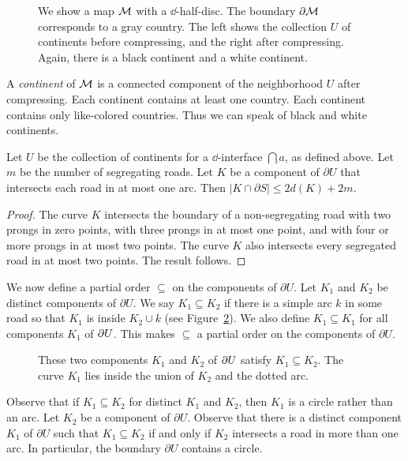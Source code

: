 \begin{figure}
% 
\hspace{.5in}
\caption{
We show a map $\mathcal{M}$ with a $\dd$-half-disc.  The boundary $\partial\mathcal{M}$ corresponds to a gray country.  The left shows the collection $U$ of continents before compressing, and the right after compressing.  Again, there is a black continent and a white continent.}
\label{graymap}
\end{figure}

A \emph{continent} of $\mathcal{M}$ is a connected component of the
neighborhood $U$ after compressing.  Each continent 
contains at least one country.
Each continent contains only like-colored countries.
Thus we can speak of black and white continents.

\begin{lemma}
\label{main lemma fact}
Let $U$ be the collection of continents for a $\dd$-interface
$\dint{a}$, as defined above.  Let $m$ be the number of 
segregating roads.  
Let $K$ be a component of $\partial U$ that intersects each road 
in at most one arc.  Then $|K\cap \partial S|\leq 2d(K)+2m$.
\end{lemma}

\begin{proof}
The curve $K$ intersects the boundary of a non-segregating road with 
two prongs in zero points, with three prongs in at most one point, 
and with four or more prongs in at most two points.
The curve $K$ also intersects every segregated road in at most 
two points.  The result follows.
\end{proof}

We now define a partial order $\subseteq$ on the components of 
$\partial U$.  Let $K_1$ and $K_2$ be distinct components of 
$\partial U$.  We say $K_1\subseteq K_2$ if there is a
simple arc $k$ in some road so that $K_1$ is inside $K_2\cup k$
(see Figure~\ref{partialorder}).
We also define $K_1\subseteq K_1$ for all components $K_1$
of $\partial U$.  This makes $\subseteq$ a partial order on the components
of $\partial U$.

\begin{figure}
%
%
\caption{
These two components $K_1$ and $K_2$ of $\partial U$ satisfy 
$K_1\subseteq K_2$.  The curve $K_1$ lies inside the union
of $K_2$ and the dotted arc.
}
\label{partialorder}
\end{figure}

Observe that if $K_1\subseteq K_2$ for distinct $K_1$ and $K_2$, then $K_1$ is a circle rather than an arc.  Let $K_2$ be a component of $\partial U$.  Observe that there is a distinct component $K_1$ of $\partial U$ such that $K_1\subseteq K_2$ if and only if $K_2$ intersects a road in more than one arc.  In particular, the boundary $\partial U$ contains a circle.

